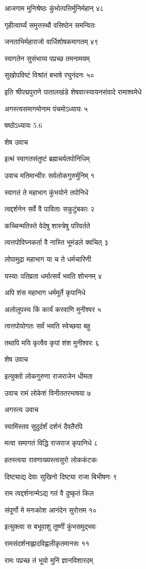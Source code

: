 आजगाम मुनिश्रेष्ठः कुंभोत्पत्तिर्मुनिर्महान् ४८

गृहीत्वार्घ्यं समुत्तस्थौ वसिष्ठेन समन्वितः

जनताभिर्महाराजो वार्धिशोषकमागतम् ४९

स्वागतेन सुसंभाव्य पप्रच्छ तमनामयम्

सुखोपविष्टं विश्रांतं बभाषे रघुनंदनः ५०

इति श्रीपद्मपुराणे पातालखंडे शेषवात्स्यायनसंवादे रामाश्वमेधे

अगस्त्यसमागमोनाम पंचमोऽध्यायः ५

षष्ठोऽध्यायः 5.6

शेष उवाच

इत्थं स्वागतसंतुष्टं ब्रह्मचर्यतपोनिधिम्

उवाच मतिमान्वीरः सर्वलोकगुरुर्मुनिम् १

स्वागतं ते महाभाग कुंभयोने तपोनिधे

त्वद्दर्शनेन सर्वे वै पाविताः सकुटुंबकाः २

कच्चिन्मतिस्ते वेदेषु शास्त्रेषु परिवर्तते

त्वत्तपोविघ्नकर्ता वै नास्ति भूमंडले क्वचित् ३

लोपामुद्रा महाभाग या च ते धर्मचारिणी

यस्याः पतिव्रता धर्मात्सर्वं भवति शोभनम् ४

अपि शंस महाभाग धर्ममूर्ते कृपानिधे

अलोलुपस्य किं कार्यं करवाणि मुनीश्वर ५

त्वत्तपोयोगतः सर्वं भवति स्वेच्छया बहु

तथापि मयि कृत्वैव कृपां शंश मुनीश्वरः ६

शेष उवाच

इत्युक्तो लोकगुरुणा राजराजेन धीमता

उवाच रामं लोकेशं विनीततरभाषया ७

अगस्त्य उवाच

स्वामिंस्तव सुदुर्दर्शं दर्शनं दैवतैरपि

मत्वा समागतं विद्धि राजराज कृपानिधे ८

हतस्त्वया रावणाख्यस्त्वसुरो लोककंटकः

दिष्ट्याद्य देवाः सुखिनो दिष्ट्या राजा बिभीषणः ९

राम त्वद्दर्शनान्मेऽद्य गतं वै दुष्कृतं किल

संपूर्णो मे मनःकोश आनंदेन सुरोत्तम १०

इत्युक्त्वा स बभूवाशु तूष्णीं कुंभसमुद्भवः

रामसंदर्शनाह्लादविह्वलीकृतमानसः ११

रामः पप्रच्छ तं भूयो मुनिं ज्ञानविशारदम्


